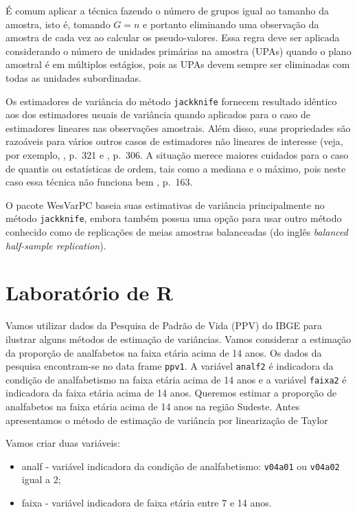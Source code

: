 \documentclass[]{book}
\providecommand{\tightlist}{%
  \setlength{\itemsep}{0pt}\setlength{\parskip}{0pt}}
\theoremstyle{definition}
\theoremstyle{definition}
\theoremstyle{definition}
\theoremstyle{remark}
\let\BeginKnitrBlock\begin \let\EndKnitrBlock\end
\begin{document}
\BeginKnitrBlock{remark}
{}É comum aplicar a técnica fazendo o
número de grupos igual ao tamanho da amostra, isto é, tomando \(G=n\) e
portanto eliminando uma observação da amostra de cada vez ao calcular os
pseudo-valores. Essa regra deve ser aplicada considerando o número de
unidades primárias na amostra (UPAs) quando o plano amostral é em
múltiplos estágios, pois as UPAs devem sempre ser eliminadas com todas
as unidades subordinadas.
\EndKnitrBlock{remark}

Os estimadores de variância do método \texttt{jackknife} fornecem
resultado idêntico aos dos estimadores usuais de variância quando
aplicados para o caso de estimadores lineares nas observações amostrais.
Além disso, suas propriedades são razoáveis para vários outros casos de
estimadores não lineares de interesse (veja, por exemplo,
\citep{cochran}, p.~321 e \citep{W85}, p.~306. A situação merece maiores
cuidados para o caso de quantis ou estatísticas de ordem, tais como a
mediana e o máximo, pois neste caso essa técnica não funciona bem
\citep{W85}, p.~163.

O pacote WesVarPC \citep{Westat} baseia suas estimativas de variância
principalmente no método \texttt{jackknife}, embora também possua uma
opção para usar outro método conhecido como de replicações de meias
amostras balanceadas (do inglês \emph{balanced half-sample
replication}).

\section{Laboratório de R}\label{laboratorio-de-r}

Vamos utilizar dados da Pesquisa de Padrão de Vida (PPV) do IBGE para
ilustrar alguns métodos de estimação de variâncias. Vamos considerar a
estimação da proporção de analfabetos na faixa etária acima de 14 anos.
Os dados da pesquisa encontram-se no data frame \texttt{ppv1}. A
variável \texttt{analf2} é indicadora da condição de analfabetismo na
faixa etária acima de 14 anos e a variável \texttt{faixa2} é indicadora
da faixa etária acima de 14 anos. Queremos estimar a proporção de
analfabetos na faixa etária acima de 14 anos na região Sudeste. Antes
apresentamos o método de estimação de variância por linearização de
Taylor

Vamos criar duas variáveis:

\begin{itemize}
\tightlist
\item
  analf - variável indicadora da condição de analfabetismo:
  \texttt{v04a01} ou \texttt{v04a02} igual a 2;
\item
  faixa - variável indicadora de faixa etária entre 7 e 14 anos.
\end{itemize}
\end{document}
